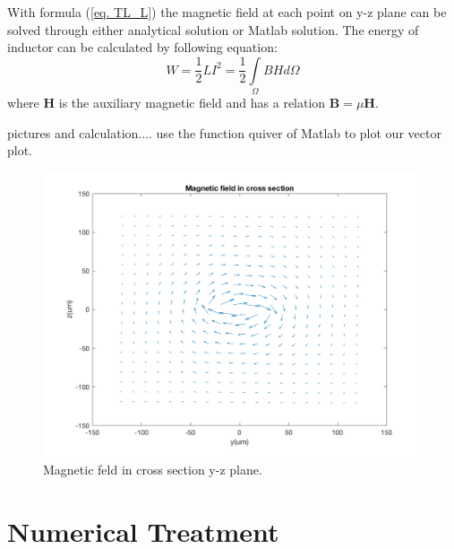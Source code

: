 \documentclass[11pt,final]{scrbook}
\begin{document}
With formula (\ref{eq. TL_L}) the magnetic field at each point on y-z plane can be solved through either analytical solution or Matlab solution. The energy of inductor can be calculated by following equation:
\begin{equation}
  W=\frac{1}{2}LI^{2}=\frac{1}{2}\underset { \Omega  }{\int }{ B H  } d\Omega
 \end{equation} 
 where $\textbf{H}$ is the auxiliary magnetic field and has a relation $\textbf{B}=\mu \textbf{H}$.

 pictures and calculation....
 use the function quiver of Matlab to plot our vector plot.
\begin{figure}[htbp]
\begin{center}
\includegraphics[scale=0.3]{images/TL_L.pdf}
\caption{Magnetic feld in cross section y-z plane.}
\label{fig:TL_L}
\end{center}
\end{figure}


\chapter{Numerical Treatment}
\end{document}
